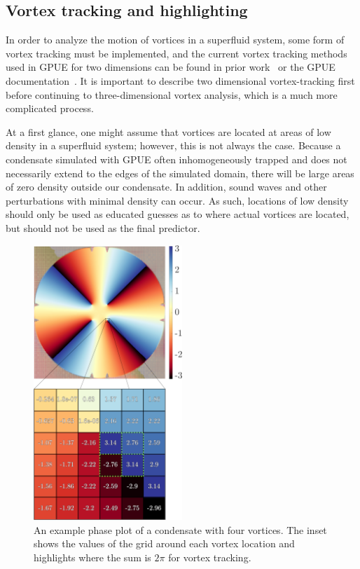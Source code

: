 \subsection{Vortex tracking and highlighting}
\label{sec:tracking}

In order to analyze the motion of vortices in a superfluid system, some form of vortex tracking must be implemented, and the current vortex tracking methods used in GPUE for two dimensions can be found in prior work~\cite{o2017} or the GPUE documentation~\cite{docs}.
It is important to describe two dimensional vortex-tracking first before continuing to three-dimensional vortex analysis, which is a much more complicated process.

At a first glance, one might assume that vortices are located at areas of low density in a superfluid system; however, this is not always the case.
Because a condensate simulated with GPUE often inhomogeneously trapped and does not necessarily extend to the edges of the simulated domain, there will be large areas of zero density outside our condensate.
In addition, sound waves and other perturbations with minimal density can occur.
As such, locations of low density should only be used as educated guesses as to where actual vortices are located, but should not be used as the final predictor.

\begin{figure}
\center \includegraphics[width = 0.5\textwidth]{data/gpu/vortex_tracking/phi_grid.png}
\caption{An example phase plot of a condensate with four vortices.
The inset shows the values of the grid around each vortex location and highlights where the sum is $2\pi$ for vortex tracking.
}
\label{fig:phase}
\end{figure}


